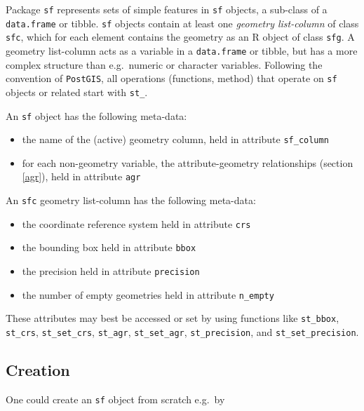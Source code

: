 \documentclass[]{book}
\providecommand{\tightlist}{%
  \setlength{\itemsep}{0pt}\setlength{\parskip}{0pt}}
\begin{document}
Package \texttt{sf} represents sets of simple features in \texttt{sf} objects,
a sub-class of a \texttt{data.frame} or tibble. \texttt{sf} objects contain at
least one \emph{geometry list-column} of class \texttt{sfc}, which for each
element contains the geometry as an R object of class \texttt{sfg}.
A geometry list-column acts as a variable in a \texttt{data.frame}
or tibble, but has a more complex structure than e.g.~numeric or
character variables. Following the convention of \texttt{PostGIS}, all
operations (functions, method) that operate on \texttt{sf} objects or
related start with \texttt{st\_}.

An \texttt{sf} object has the following meta-data:

\begin{itemize}
\tightlist
\item
  the name of the (active) geometry column, held in attribute \texttt{sf\_column}
\item
  for each non-geometry variable, the attribute-geometry
  relationships (section \ref{agr}), held in attribute \texttt{agr}
\end{itemize}

An \texttt{sfc} geometry list-column has the following meta-data:

\begin{itemize}
\tightlist
\item
  the coordinate reference system held in attribute \texttt{crs}
\item
  the bounding box held in attribute \texttt{bbox}
\item
  the precision held in attribute \texttt{precision}
\item
  the number of empty geometries held in attribute \texttt{n\_empty}
\end{itemize}

These attributes may best be accessed or set by using
functions like \texttt{st\_bbox}, \texttt{st\_crs}, \texttt{st\_set\_crs}, \texttt{st\_agr},
\texttt{st\_set\_agr}, \texttt{st\_precision}, and \texttt{st\_set\_precision}.

\hypertarget{creation}{%
\subsection{Creation}\label{creation}}

One could create an \texttt{sf} object from scratch e.g.~by
\end{document}
